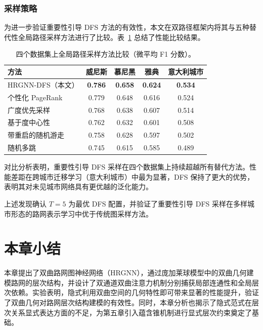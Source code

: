 \subsubsection{采样策略}

为进一步验证重要性引导 DFS 方法的有效性，本文在双路径框架内将其与五种替代性全局路径采样方法进行了比较。表~\ref{tab:sampling_strategy} 总结了性能比较结果。

\begin{table}[H]
\centering
\caption{四个数据集上全局路径采样方法比较（微平均 F1 分数）。}
\label{tab:sampling_strategy}
\footnotesize
\begin{tabular}{@{}lcccc@{}}
\toprule
\textbf{方法} & \textbf{威尼斯} & \textbf{慕尼黑} & \textbf{雅典} & \textbf{意大利城市} \\
\midrule
HRGNN-DFS（本文）& \textbf{0.786} & \textbf{0.658} & \textbf{0.624} & \textbf{0.534} \\
个性化 PageRank & 0.779 & 0.648 & 0.616 & 0.524 \\
广度优先采样 & 0.768 & 0.638 & 0.607 & 0.514 \\
基于度中心性 & 0.762 & 0.632 & 0.601 & 0.508 \\
带重启的随机游走 & 0.758 & 0.628 & 0.597 & 0.502 \\
随机多跳 & 0.745 & 0.615 & 0.585 & 0.489 \\
\bottomrule
\end{tabular}
\end{table}

对比分析表明，重要性引导 DFS 采样在四个数据集上持续超越所有替代方法。性能差距在跨城市迁移学习（意大利城市）中最为显著，DFS 保持了更大的优势，表明其对未见城市网络具有更优越的泛化能力。

上述发现确认 $T=5$ 为最优 DFS 配置，并验证了重要性引导 DFS 采样在多样城市形态的路网表示学习中优于传统图采样方法。


\section{本章小结}

本章提出了双曲路网图神经网络（HRGNN），通过庞加莱球模型中的双曲几何建模路网的层次结构，并设计了双通道双曲注意力机制分别捕获局部连通性和全局层次依赖。实验表明，隐式利用双曲空间的几何特性即可带来显著的性能提升，验证了双曲几何对路网层次结构建模的有效性。同时，本章分析也揭示了隐式范式在层次关系显式表达方面的不足，为第五章引入蕴含锥机制进行显式层次约束奠定了基础。